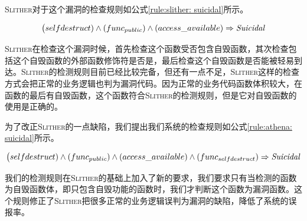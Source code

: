 \textsc{Slither}对于这个漏洞的检查规则如公式\ref{rule:slither: suicidal}所示。
\begin{mdframed}[
	linewidth = 1pt,
	innertopmargin = -5pt,
	innerbottommargin = 3pt,
	outerlinewidth = 1pt
	]
    \small
	\begin{equation} \label{rule:slither: suicidal}
    \big (selfdestruct) \wedge (func_{public}) \wedge (access\_available) \Rightarrow \text{\emph{Suicidal}}
	\end{equation}
\end{mdframed}
\textsc{Slither}在检查这个漏洞时候，首先检查这个函数受否包含自毁函数，其次检查包括这个自毁函数的外部函数修饰符是否是，最后检查这个自毁函数是否能被轻易到达。\textsc{Slither}的检测规则目前已经比较完备，但还有一点不足，\textsc{Slither}这样的检查方式会把正常的业务逻辑也判为漏洞代码。因为正常的业务代码函数体积较大，在函数的最后有自毁函数，这个函数符合\textsc{Slither}的检测规则，但是它对自毁函数的使用是正确的。

为了改正\textsc{Slither}的一点缺陷，我们提出我们系统的检查规则如公式\ref{rule:athena: suicidal}所示。
\begin{mdframed}[
	linewidth = 1pt,
	innertopmargin = -10pt,
	innerbottommargin = 3pt,
	outerlinewidth = 1pt
	]
    \small
	\begin{equation} \label{rule:athena: suicidal}
    \big (selfdestruct) \wedge (func_{public}) \wedge (access\_available) \wedge (func_{selfdestruct}) \Rightarrow \text{\emph{Suicidal}}
	\end{equation}
\end{mdframed}
我们的检测规则在\textsc{Slither}的基础上加入了新的要求，我们要求只有当检测的函数为自毁函数体，即只包含自毁功能的函数时，我们才判断这个函数为漏洞函数。这个规则修正了\textsc{Slither}把很多正常的业务逻辑误判为漏洞的缺陷，降低了系统的误报率。